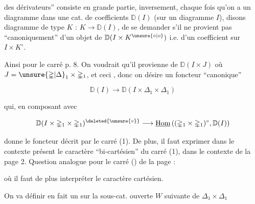 
des dérivateurs'' consiste en grande partie, inversement, chaque fois qu'on a un diagramme dans une cat. de coefficients $\mathbb D(I)$ (sur un  diagramme $I$), disons diagramme de type $K$ : $K\longrightarrow\mathbb D(I)$, de se demander s'il ne provient pas ``canoniquement'' d'un objet de $\mathbb D(I\times K^{\unsure{\circ|o}})$ i.e. d'un coefficient sur $I\times K^{\circ}$.

Ainsi pour le carré p. 8. On voudrait qu'il provienne de $\mathbb D(I\times J)$ \deleted{\unsure{=}} où $J=\unsure{\mathbb{\Delta}|\Delta}_{1}\times\mathbb{\Delta}_{1}$,  et ceci , donc on désire un foncteur ``canonique''

\[
\mathbb D(I)\longrightarrow\mathbb D(I\times\mathbb{\Delta}_{1}\times\mathbb{\Delta}_{1})
\]

qui, en composant avec

\[
\mathbb D(I\times\mathbb{\Delta}_{1}\times\mathbb{\Delta}_{1})^{\deleted{\unsure{\circ}}}\longrightarrow\underline{\mathrm{Hom}}\,((\mathbb{\Delta}_{1}\times\mathbb{\Delta}_{1})^{\circ},\mathbb D(I))
\]

donne le foncteur décrit par le carré (1). De plus, il faut exprimer dans le contexte présent le caractère ``bi-cartésien'' du carré (1), dans le contexte de la page 2. Question analogue pour le carré () de la page  :


où il faut de plus interpréter le caractère cartésien.

On va définir en fait un  sur la sous-cat. ouverte $W$ suivante de $\mathbb{\Delta}_{1}\times\mathbb{\Delta}_{1}$


